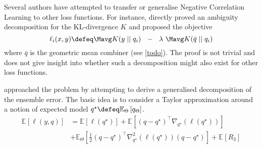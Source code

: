 \documentclass[../main.tex]{subfiles}
\begin{document}
Several authors have attempted to transfer or generalise Negative Correlation Learning to other loss functions. For instance, \cite{webb21} directly proved an ambiguity decomposition for the KL-divergence $K$ and proposed the objective
$$
\ell_{i}(x,y) \defeq \Mavg K(y \mid\mid q_{i}) ~ ~ - ~ ~ \lambda ~ \Mavg K(\bar{q} \mid\mid q_{i})
$$
where $\bar{q}$ is the geometric mean combiner (see \ref{todo}). The proof is not trivial and does not give insight into whether such a decomposition might also exist for other loss functions.

\cite{buschjaeger} approached the problem by attempting to derive a generalised decomposition of the ensemble error. The basic idea is to consider a Taylor approximation around a notion of expected model $q^\star \defeq \mathbb{E}_{\Theta}\left[ q_{\Theta} \right]$.
\begin{align*}
\mathbb{E}_{}\left[ \ell(y, q) \right]  &= 
\mathbb{E}_{}\left[ \ell(q^\star) \right] 
+ \mathbb{E}_{}\left[ (q - q^\star)^\top \nabla_{q^\star}(\ell (q^\star)) \right]  \\
&+ \mathbb{E}_{\Theta}\left[ \frac{1}{2} (q-q^\star)^\top\nabla^2_{q^\star}(\ell(q^\star))(q-q^\star) \right] 
+ \mathbb{E}_{}\left[ R_{3} \right] 
\end{align*}
\end{document}
